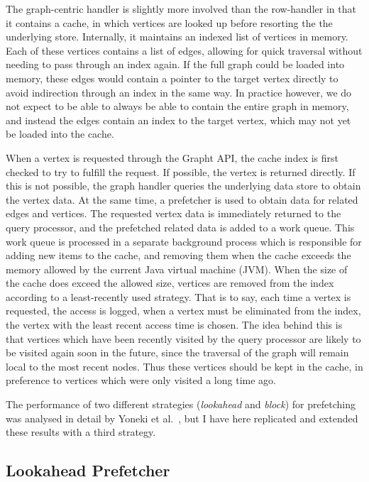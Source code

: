 The graph-centric handler is slightly more involved than the row-handler in
that it contains a cache, in which vertices are looked up before resorting the
the underlying store. Internally, it maintains an indexed list of vertices in
memory. Each of these vertices contains a list of edges, allowing for quick
traversal without needing to pass through an index again. If the full graph
could be loaded into memory, these edges would contain a pointer to the
target vertex directly to avoid indirection through an index in the same way.
In practice however, we do not expect to be able to always be able to contain
the entire graph in memory, and instead the edges contain an index to the
target vertex, which may not yet be loaded into the cache.

When a vertex is requested through the Grapht API, the cache index is first
checked to try to fulfill the request. If possible, the vertex is returned
directly. If this is not possible, the graph handler queries the underlying
data store to obtain the vertex data. At the same time, a prefetcher is used
to obtain data for related edges and vertices. The requested vertex data is
immediately returned to the query processor, and the prefetched related data
is added to a work queue. This work queue is processed in a separate
background process which is responsible for adding new items to the cache, and
removing them when the cache exceeds the memory allowed by the current Java
virtual machine (JVM). When the size of the cache does exceed the allowed
size, vertices are removed from the index according to a least-recently used
strategy. That is to say, each time a vertex is requested, the access is
logged, when a vertex must be eliminated from the index,  the vertex with the
least recent access time is chosen. The idea behind this is that vertices
which have  been recently visited by the query processor are likely to be
visited again soon in the future, since the traversal of the graph will remain
local to the most recent nodes. Thus these vertices should be kept in the
cache, in preference to vertices which were only visited a long time ago.

The performance of two different strategies (\textit{lookahead} and
\textit{block}) for prefetching was analysed in detail by Yoneki et
al.~\cite{crackle}, but I have here replicated and extended these results with
a third strategy. 

\subsection{Lookahead Prefetcher}

